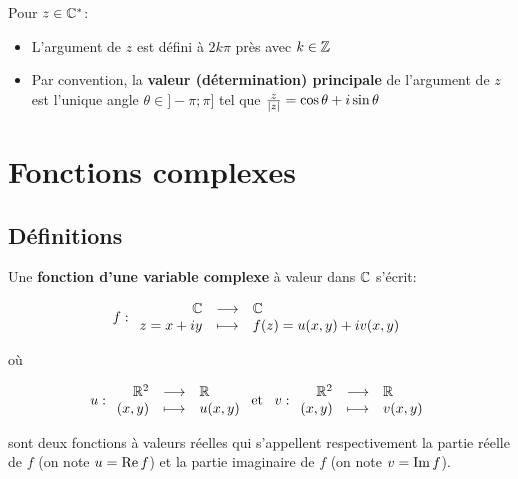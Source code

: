 \begin{remark}
    Pour $z \in \mathbb{C}^*$:
    \begin{itemize}
        \item 
        L'argument de $z$ est défini à $2k\pi$ près avec $k \in \mathbb{Z}$
        \item 
        Par convention, la \textbf{valeur (détermination) principale} de l'argument de $z$ est l'unique angle $\theta \in ] -\pi ; \pi ]$ tel que $\frac{z}{\left|z\right|} = \cos \theta + i \sin \theta$
    \end{itemize}
\end{remark}


\section{Fonctions complexes}

\subsection{Définitions}

\begin{definition}
    Une \textbf{fonction d'une variable complexe} à valeur dans $\mathbb{C}$ s'écrit:
    
    \[
    f: \begin{array}{{rcl}}
    \Cx & \longrightarrow & \Cx \\
    z = x+iy & \longmapsto & f(z) = u(x,y) + i v(x,y) \\
    \end{array}
    \]
    
    où
    
    \[
    u: \begin{array}{{rcl}}
    \R^2 & \longrightarrow & \R \\
    (x,y) & \longmapsto & u(x,y) \\
    \end{array}
    \textrm{ et }\enspace
    v: \begin{array}{{rcl}}
    \R^2 & \longrightarrow & \R \\
    (x,y) & \longmapsto & v(x,y) \\
    \end{array}
    \]
    
    sont deux fonctions à valeurs réelles qui s'appellent respectivement la partie réelle de $f$ (on note $u = \operatorname{Re} f$) et la partie imaginaire de $f$ (on note $v = \operatorname{Im} f$).
\end{definition}

